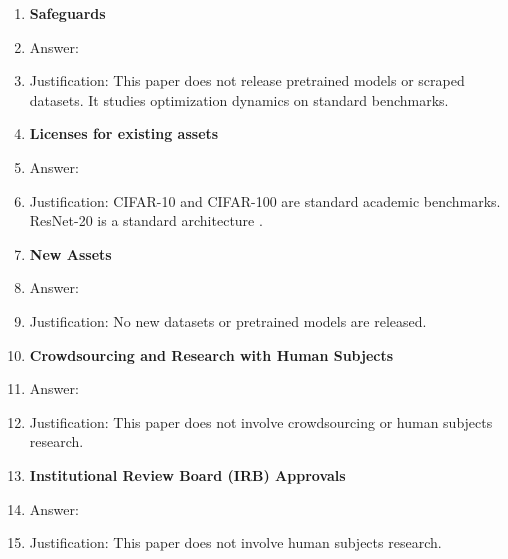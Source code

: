 \documentclass{article}
\begin{document}
\begin{enumerate}
\item {\bf Safeguards}
    \item[] Answer: \answerNA{}
    \item[] Justification: This paper does not release pretrained models or scraped datasets. It studies optimization dynamics on standard benchmarks.

\item {\bf Licenses for existing assets}
    \item[] Answer: \answerYes{}
    \item[] Justification: CIFAR-10 and CIFAR-100 are standard academic benchmarks. ResNet-20 is a standard architecture \citep{he2016resnet}.

\item {\bf New Assets}
    \item[] Answer: \answerNA{}
    \item[] Justification: No new datasets or pretrained models are released.

\item {\bf Crowdsourcing and Research with Human Subjects}
    \item[] Answer: \answerNA{}
    \item[] Justification: This paper does not involve crowdsourcing or human subjects research.

\item {\bf Institutional Review Board (IRB) Approvals}
    \item[] Answer: \answerNA{}
    \item[] Justification: This paper does not involve human subjects research.

\end{enumerate}
\end{document}

